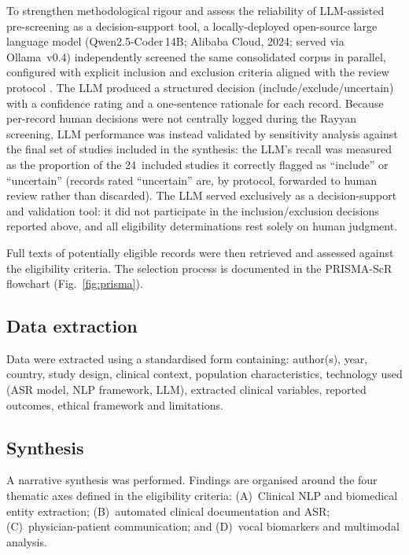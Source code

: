 \documentclass[review,12pt]{elsarticle}
\begin{document}
To strengthen methodological rigour and assess the reliability of
LLM-assisted pre-screening as a decision-support tool, a locally-deployed
open-source large language model (Qwen2.5-Coder\,14B; Alibaba Cloud, 2024;
served via Ollama~v0.4) independently screened the same consolidated corpus
in parallel, configured with explicit inclusion and exclusion criteria
aligned with the review protocol \citep{Scherbakov2025}. The LLM produced a
structured decision (include/exclude/uncertain) with a confidence rating
and a one-sentence rationale for each record. Because per-record human
decisions were not centrally logged during the Rayyan screening, LLM
performance was instead validated by sensitivity analysis against the final
set of studies included in the synthesis: the LLM's recall was measured as
the proportion of the 24~included studies it correctly flagged as
``include'' or ``uncertain'' (records rated ``uncertain'' are, by protocol,
forwarded to human review rather than discarded). The LLM served exclusively
as a decision-support and validation tool: it did not participate in the
inclusion/exclusion decisions reported above, and all eligibility
determinations rest solely on human judgment.

Full texts of potentially eligible records were then retrieved and
assessed against the eligibility criteria. The selection process is
documented in the PRISMA-ScR flowchart (Fig.~\ref{fig:prisma}).

\subsection{Data extraction}

Data were extracted using a standardised form containing: author(s), year,
country, study design, clinical context, population characteristics,
technology used (ASR model, NLP framework, LLM), extracted clinical variables,
reported outcomes, ethical framework and limitations.

\subsection{Synthesis}

A narrative synthesis was performed. Findings are organised around the four
thematic axes defined in the eligibility criteria:
(A)~Clinical NLP and biomedical entity extraction;
(B)~automated clinical documentation and ASR;
(C)~physician-patient communication; and
(D)~vocal biomarkers and multimodal analysis.
\end{document}
